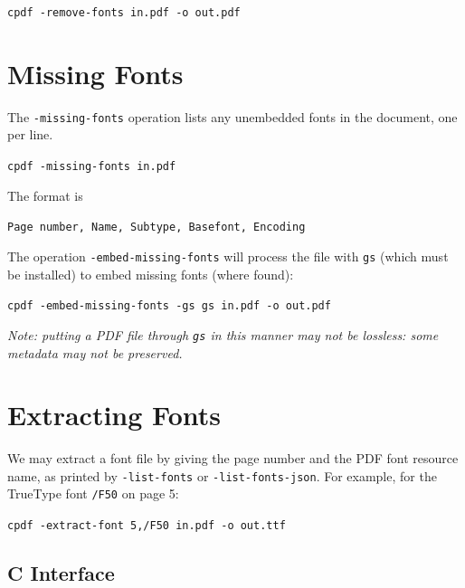\documentclass{book}
\begin{document}
  \begin{framed}
  \small\noindent\verb!cpdf -remove-fonts in.pdf -o out.pdf!
  \vspace{2.5mm}
  \end{framed}

\section{Missing Fonts}\label{listmisingfonts}
  The \verb!-missing-fonts! operation lists any unembedded fonts in the document, one per line.

  \begin{framed}
  \small\noindent\verb!cpdf -missing-fonts in.pdf!
  \end{framed}

  \noindent The format is

  \begin{framed}
  \small\noindent\verb!Page number, Name, Subtype, Basefont, Encoding!
  \end{framed}

\noindent The operation \texttt{-embed-missing-fonts} will process the file with \texttt{gs} (which must be installed) to embed missing fonts (where found):

  \begin{framed}
  \small\noindent\verb!cpdf -embed-missing-fonts -gs gs in.pdf -o out.pdf!
  \end{framed}

\noindent\textit{Note: putting a PDF file through \texttt{gs} in this manner may not be lossless: some metadata may not be preserved.}

\section{Extracting Fonts}

We may extract a font file by giving the page number and the PDF font resource name, as printed by \texttt{-list-fonts} or \texttt{-list-fonts-json}. For example, for the TrueType font \texttt{/F50} on page 5:

  \begin{framed}
  \small\noindent\verb!cpdf -extract-font 5,/F50 in.pdf -o out.ttf!
  \end{framed}

\begin{cpdflib}
\clearpage
\section*{C Interface}
\begin{small}\tt

\end{small}
\end{cpdflib}
\end{document}

